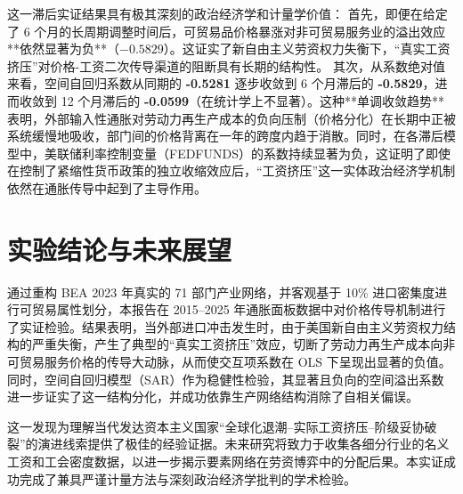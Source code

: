 \documentclass[UTF8,a4paper,11pt]{ctexart}
\begin{document}
这一滞后实证结果具有极其深刻的政治经济学和计量学价值：
首先，即便在给定了 6 个月的长周期调整时间后，可贸易品价格暴涨对非可贸易服务业的溢出效应**依然显著为负**（$-0.5829$）。这证实了新自由主义劳资权力失衡下，“真实工资挤压”对价格-工资二次传导渠道的阻断具有长期的结构性。
其次，从系数绝对值来看，空间自回归系数从同期的 \textbf{-0.5281} 逐步收敛到 6 个月滞后的 \textbf{-0.5829}，进而收敛到 12 个月滞后的 \textbf{-0.0599}（在统计学上不显著）。这种**单调收敛趋势**表明，外部输入性通胀对劳动力再生产成本的负向压制（价格分化）在长期中正被系统缓慢地吸收，部门间的价格背离在一年的跨度内趋于消散。同时，在各滞后模型中，美联储利率控制变量（FEDFUNDS）的系数持续显著为负，这证明了即使在控制了紧缩性货币政策的独立收缩效应后，“工资挤压”这一实体政治经济学机制依然在通胀传导中起到了主导作用。


\section{实验结论与未来展望}
通过重构 BEA 2023 年真实的 71 部门产业网络，并客观基于 10\% 进口密集度进行可贸易属性划分，本报告在 2015--2025 年通胀面板数据中对价格传导机制进行了实证检验。结果表明，当外部进口冲击发生时，由于美国新自由主义劳资权力结构的严重失衡，产生了典型的“真实工资挤压”效应，切断了劳动力再生产成本向非可贸易服务价格的传导大动脉，从而使交互项系数在 OLS 下呈现出显著的负值。同时，空间自回归模型（SAR）作为稳健性检验，其显著且负向的空间溢出系数进一步证实了这一结构分化，并成功依靠生产网络结构消除了自相关偏误。

这一发现为理解当代发达资本主义国家“全球化退潮--实际工资挤压--阶级妥协破裂”的演进线索提供了极佳的经验证据。未来研究将致力于收集各细分行业的名义工资和工会密度数据，以进一步揭示要素网络在劳资博弈中的分配后果。本实证成功完成了兼具严谨计量方法与深刻政治经济学批判的学术检验。
\end{document}

